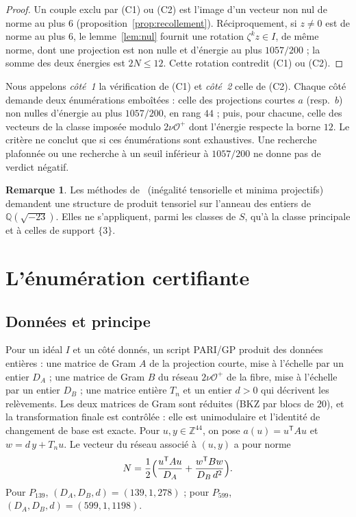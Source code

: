 \documentclass[11pt,a4paper]{amsart}
\theoremstyle{plain}
\theoremstyle{definition}
\newtheorem{remarque}[theoreme]{Remarque}
\numberwithin{equation}{section}
\newcommand{\Q}{\mathbb{Q}}
\newcommand{\Z}{\mathbb{Z}}
\newcommand{\Op}{\mathcal{O}^{+}}
\begin{document}
\begin{proof}
Un couple exclu par (C1) ou (C2) est l'image d'un vecteur non nul de norme au plus $6$ (proposition~\ref{prop:recollement}). Réciproquement, si $z\ne0$ est de norme au plus $6$, le lemme~\ref{lem:nul} fournit une rotation $\zeta^kz\in I$, de même norme, dont une projection est non nulle et d'énergie au plus $1057/200$ ; la somme des deux énergies est $2N\le12$. Cette rotation contredit (C1) ou (C2).
\end{proof}

Nous appelons \emph{côté~1} la vérification de (C1) et \emph{côté~2} celle de (C2). Chaque côté demande deux énumérations emboîtées : celle des projections courtes $a$ (resp.\ $b$) non nulles d'énergie au plus $1057/200$, en rang $44$ ; puis, pour chacune, celle des vecteurs de la classe imposée modulo $2\nu\Op$ dont l'énergie respecte la borne $12$. Le critère ne conclut que si ces énumérations sont exhaustives. Une recherche plafonnée ou une recherche à un seuil inférieur à $1057/200$ ne donne pas de verdict négatif.

\begin{remarque}
Les méthodes de~\cite{Sak26} (inégalité tensorielle et minima projectifs) demandent une structure de produit tensoriel sur l'anneau des entiers de $\Q(\sqrt{-23})$. Elles ne s'appliquent, parmi les classes de $S$, qu'à la classe principale et à celles de support $\{3\}$.
\end{remarque}

\section{L'énumération certifiante}\label{sec:certifiant}

\subsection{Données et principe}
Pour un idéal $I$ et un côté donnés, un script PARI/GP produit des données entières : une matrice de Gram $A$ de la projection courte, mise à l'échelle par un entier $D_A$ ; une matrice de Gram $B$ du réseau $2\nu\Op$ de la fibre, mise à l'échelle par un entier $D_B$ ; une matrice entière $T_n$ et un entier $d>0$ qui décrivent les relèvements. Les deux matrices de Gram sont réduites (BKZ par blocs de $20$), et la transformation finale est contrôlée : elle est unimodulaire et l'identité de changement de base est exacte. Pour $u,y\in\Z^{44}$, on pose $a(u)=u^{\mathsf T}Au$ et $w=d\,y+T_nu$. Le vecteur du réseau associé à $(u,y)$ a pour norme
\begin{equation}\label{eq:normeuy}
N=\frac12\Bigl(\frac{u^{\mathsf T}Au}{D_A}+\frac{w^{\mathsf T}Bw}{D_B\,d^2}\Bigr).
\end{equation}
Pour $P_{139}$, $(D_A,D_B,d)=(139,1,278)$ ; pour $P_{599}$, $(D_A,D_B,d)=(599,1,1198)$.
\end{document}
